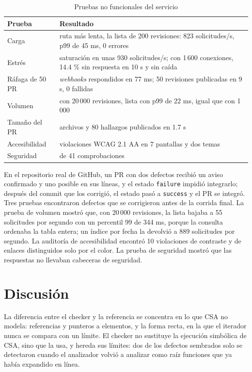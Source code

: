 \documentclass[conference]{IEEEtran}
\newcommand{\code}[1]{\texttt{#1}}
\begin{document}
\begin{table}[!t]
\caption{Pruebas no funcionales del servicio}
\label{tab:servicio}
\centering
\footnotesize
\setlength{\tabcolsep}{3pt}
\begin{tabular}{@{}>{\raggedright\arraybackslash}p{2.2cm} >{\raggedright\arraybackslash}p{5.9cm}@{}}
\hline
\textbf{Prueba} & \textbf{Resultado}\\
\hline
Carga & ruta más lenta, la lista de 200 revisiones: 823 solicitudes/s, p99 de 45 ms, 0 errores\\
Estrés & saturación en unas 930 solicitudes/s; con 1\,600 conexiones, 14.4 \% sin respuesta en 10 s y sin caída\\
Ráfaga de 50 PR & 50 \textit{webhooks} respondidos en 77 ms; 50 revisiones publicadas en 9 s, 0 fallidas\\
Volumen & con 20\,000 revisiones, lista con p99 de 22 ms, igual que con 1\,000\\
Tamaño del PR & 40 archivos y 80 hallazgos publicados en 1.7 s\\
Accesibilidad & 0 violaciones WCAG 2.1 AA en 7 pantallas y dos temas\\
Seguridad & 41 de 41 comprobaciones\\
\hline
\end{tabular}
\end{table}

En el repositorio real de GitHub, un PR con dos defectos recibió un aviso confirmado y uno posible en sus líneas, y el estado \code{failure} impidió integrarlo; después del commit que los corrigió, el estado pasó a \code{success} y el PR se integró. Tres pruebas encontraron defectos que se corrigieron antes de la corrida final. La prueba de volumen mostró que, con 20\,000 revisiones, la lista bajaba a 55 solicitudes por segundo con un percentil 99 de 344 ms, porque la consulta ordenaba la tabla entera; un índice por fecha la devolvió a 889 solicitudes por segundo. La auditoría de accesibilidad encontró 10 violaciones de contraste y de enlaces distinguidos solo por el color. La prueba de seguridad mostró que las respuestas no llevaban cabeceras de seguridad.

\section{Discusión}

La diferencia entre el checker y la referencia se concentra en lo que CSA no modela: referencias y punteros a elementos, y la forma recta, en la que el iterador nunca se compara con un límite. El checker no sustituye la ejecución simbólica de CSA, sino que la usa, y hereda sus límites: dos de los defectos sembrados solo se detectaron cuando el analizador volvió a analizar como raíz funciones que ya había expandido en línea.
\end{document}
